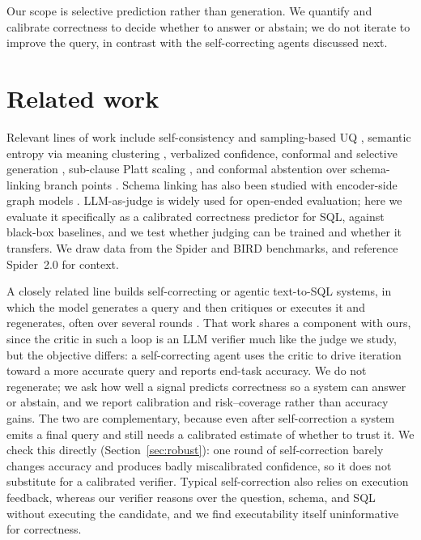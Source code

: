 \documentclass[11pt]{article}
\begin{document}
Our scope is selective prediction rather than generation. We quantify and calibrate correctness to
decide whether to answer or abstain; we do not iterate to improve the query, in contrast with the
self-correcting agents discussed next.

\section{Related work}
\label{sec:related}
Relevant lines of work include self-consistency and sampling-based UQ
\citep{wang2023selfconsistency}, semantic entropy via meaning clustering
\citep{kuhn2023semantic,farquhar2024semantic}, verbalized confidence, conformal and selective
generation \citep{geifman2017selective,angelopoulos2021ltt,angelopoulos2023conformalrisk}, sub-clause
Platt scaling \citep{ramachandran2024calibrating}, and conformal abstention over schema-linking
branch points \citep{somov2025rts}. Schema linking has also been studied with encoder-side graph
models \citep{wang2020ratsql,cao2021lgesql}. LLM-as-judge is widely used for open-ended evaluation;
here we evaluate it specifically as a calibrated correctness predictor for SQL, against black-box
baselines, and we test whether judging can be trained and whether it transfers. We draw data from the
Spider \citep{yu2018spider} and BIRD \citep{li2023bird} benchmarks, and reference Spider~2.0
\citep{lei2025spider2} for context.

A closely related line builds self-correcting or agentic text-to-SQL systems, in which the model
generates a query and then critiques or executes it and regenerates, often over several rounds
\citep{shinn2023reflexion,chen2023selfdebug,pourreza2023dinsql,wang2024macsql}. That work shares a
component with ours, since the critic in such a loop is an LLM verifier much like the judge we study,
but the objective differs: a self-correcting agent uses the critic to drive iteration toward a more
accurate query and reports end-task accuracy. We do not regenerate; we ask how well a signal predicts
correctness so a system can answer or abstain, and we report calibration and risk--coverage rather
than accuracy gains. The two are complementary, because even after self-correction a system emits a
final query and still needs a calibrated estimate of whether to trust it. We check this directly
(Section~\ref{sec:robust}): one round of self-correction barely changes accuracy and produces badly
miscalibrated confidence, so it does not substitute for a calibrated verifier. Typical
self-correction also relies on execution feedback, whereas our verifier reasons over the question,
schema, and SQL without executing the candidate, and we find executability itself uninformative for
correctness.
\end{document}
